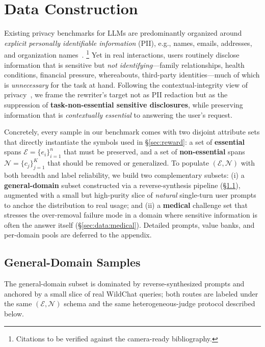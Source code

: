 \section{Data Construction}
\label{sec:data}

Existing privacy benchmarks for LLMs are predominantly organized
around \emph{explicit personally identifiable information} (PII),
e.g., names, emails, addresses, and organization
names~\citep{pilan2022text,lukas2023analyzing}.%
\footnote{Citations to be verified against the camera-ready bibliography.}
Yet in real interactions, users routinely disclose information that
is sensitive but \emph{not identifying}---family relationships,
health conditions, financial pressure, whereabouts, third-party
identities---much of which is \emph{unnecessary} for the task at
hand. Following the contextual-integrity view of
privacy~\citep{nissenbaum2010privacy,mireshghallah2024can,ngong2025contextual},
we frame the rewriter's target not as PII redaction but as the
suppression of \textbf{task-non-essential sensitive disclosures},
while preserving information that is \emph{contextually essential} to
answering the user's request.

Concretely, every sample in our benchmark comes with two disjoint
attribute sets that directly instantiate the symbols used in
\S\ref{sec:reward}: a set of \textbf{essential} spans
$\mathcal{E}=\{e_i\}_{i=1}^{n}$ that must be preserved, and a set of
\textbf{non-essential} spans $\mathcal{N}=\{c_j\}_{j=1}^{K}$ that
should be removed or generalized. To populate
$(\mathcal{E},\mathcal{N})$ with both breadth and label reliability,
we build two complementary subsets: (i) a \textbf{general-domain}
subset constructed via a reverse-synthesis pipeline
(\S\ref{sec:data:reverse}), augmented with a small but high-purity
slice of \emph{natural} single-turn user prompts to anchor the
distribution to real usage; and (ii) a \textbf{medical} challenge
set that stresses the over-removal failure mode in a domain where
sensitive information is often the answer itself
(\S\ref{sec:data:medical}). Detailed prompts, value banks, and
per-domain pools are deferred to the appendix.

\subsection{General-Domain Samples}
\label{sec:data:reverse}

The general-domain subset is dominated by reverse-synthesized prompts
and anchored by a small slice of real WildChat queries; both routes
are labeled under the same $(\mathcal{E},\mathcal{N})$ schema and
the same heterogeneous-judge protocol described below.

